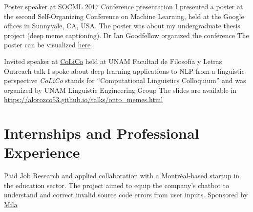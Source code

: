 \documentclass[8pt,a4paper,sans]{moderncv} %
\begin{document}
        {Poster speaker at SOCML 2017}
        {Conference presentation}
        {I presented a poster at the second Self-Organizing Conference on Machine Learning, held at the Google offices in Sunnyvale, CA, USA. The poster was about my undergraduate thesis project (deep meme captioning). Dr Ian Goodfellow organized the conference}
        {The poster can be visualized \href{https://drive.google.com/file/d/1DPjqiXcmliwPZBOfBIXxnIX_rs9EPUub/view?usp=sharing}{here}}
        {}

        {Invited speaker at \href{http://www.corpus.unam.mx/colico/VIIICoLiCo.html}{CoLiCo} held at UNAM Facultad de Filosofía y Letras}
        {Outreach talk}
        {I spoke about deep learning applications to NLP from a linguistic perspective}
        {\emph{CoLiCo} stands for ``Computational Linguistics Colloquium'' and was organized by UNAM Linguistic Engineering Group}
        {The slides are available in \url{https://alorozco53.github.io/talks/onto_memes.html}}






\section{Internships and Professional Experience}

        {Paid Job}
        {Research and applied collaboration with a Montréal-based startup in the education sector. 
        The project aimed to equip the company’s chatbot to understand and correct invalid
        source code errors from user inputs.}
        {Sponsored by \href{https://mila.quebec/en}{Mila}}
        {}
\end{document}
